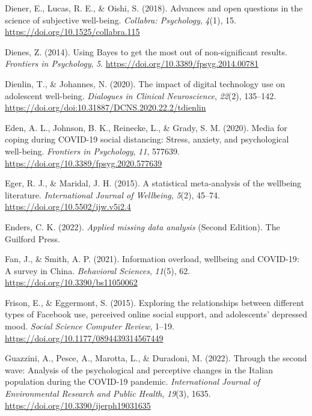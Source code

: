 \documentclass[
  man,mask,floatsintext]{apa7}
\newlength{\cslhangindent}
\newenvironment{CSLReferences}[2] %
 {\begin{list}{}{%
  \setlength{\itemindent}{0pt}
  \setlength{\leftmargin}{0pt}
  \setlength{\parsep}{0pt}
  \ifodd #1
   \setlength{\leftmargin}{\cslhangindent}
   \setlength{\itemindent}{-1\cslhangindent}
  \fi
  \setlength{\itemsep}{#2\baselineskip}}}
 {\end{list}}
\begin{document}
\begin{CSLReferences}{1}{0}
Diener, E., Lucas, R. E., \& Oishi, S. (2018). Advances and open questions in the science of subjective well-being. \emph{Collabra: Psychology}, \emph{4}(1), 15. \url{https://doi.org/10.1525/collabra.115}

Dienes, Z. (2014). Using {Bayes} to get the most out of non-significant results. \emph{Frontiers in Psychology}, \emph{5}. \url{https://doi.org/10.3389/fpsyg.2014.00781}

Dienlin, T., \& Johannes, N. (2020). The impact of digital technology use on adolescent well-being. \emph{Dialogues in Clinical Neuroscience}, \emph{22}(2), 135--142. \url{https://doi.org/doi:10.31887/DCNS.2020.22.2/tdienlin}

Eden, A. L., Johnson, B. K., Reinecke, L., \& Grady, S. M. (2020). Media for coping during {COVID-19} social distancing: {Stress}, anxiety, and psychological well-being. \emph{Frontiers in Psychology}, \emph{11}, 577639. \url{https://doi.org/10.3389/fpsyg.2020.577639}

Eger, R. J., \& Maridal, J. H. (2015). A statistical meta-analysis of the wellbeing literature. \emph{International Journal of Wellbeing}, \emph{5}(2), 45--74. \url{https://doi.org/10.5502/ijw.v5i2.4}

Enders, C. K. (2022). \emph{Applied missing data analysis} (Second Edition). The Guilford Press.

Fan, J., \& Smith, A. P. (2021). Information overload, wellbeing and {COVID-19}: {A} survey in {China}. \emph{Behavioral Sciences}, \emph{11}(5), 62. \url{https://doi.org/10.3390/bs11050062}

Frison, E., \& Eggermont, S. (2015). Exploring the relationships between different types of {Facebook} use, perceived online social support, and adolescents' depressed mood. \emph{Social Science Computer Review}, 1--19. \url{https://doi.org/10.1177/0894439314567449}

Guazzini, A., Pesce, A., Marotta, L., \& Duradoni, M. (2022). Through the second wave: {Analysis} of the psychological and perceptive changes in the {Italian} population during the {COVID-19} pandemic. \emph{International Journal of Environmental Research and Public Health}, \emph{19}(3), 1635. \url{https://doi.org/10.3390/ijerph19031635}


\end{CSLReferences}
\end{document}
